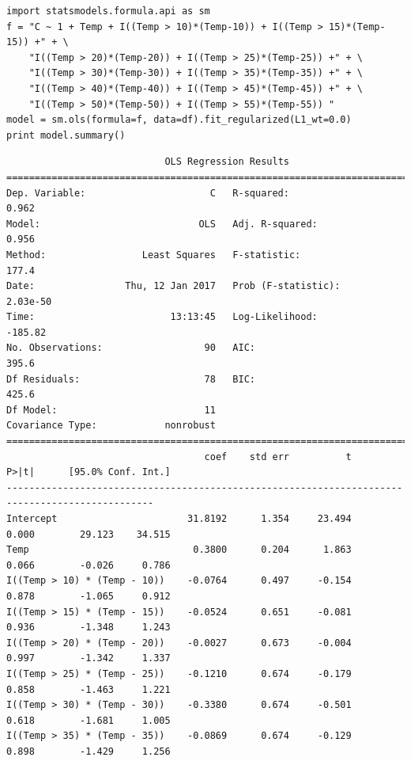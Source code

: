\documentclass[12pt,fleqn]{article}\usepackage{../../common}
\begin{document}
\begin{verbatim}
import statsmodels.formula.api as sm
f = "C ~ 1 + Temp + I((Temp > 10)*(Temp-10)) + I((Temp > 15)*(Temp-15)) +" + \
    "I((Temp > 20)*(Temp-20)) + I((Temp > 25)*(Temp-25)) +" + \
    "I((Temp > 30)*(Temp-30)) + I((Temp > 35)*(Temp-35)) +" + \
    "I((Temp > 40)*(Temp-40)) + I((Temp > 45)*(Temp-45)) +" + \
    "I((Temp > 50)*(Temp-50)) + I((Temp > 55)*(Temp-55)) " 
model = sm.ols(formula=f, data=df).fit_regularized(L1_wt=0.0)
print model.summary()
\end{verbatim}

\begin{verbatim}
                            OLS Regression Results                            
==============================================================================
Dep. Variable:                      C   R-squared:                       0.962
Model:                            OLS   Adj. R-squared:                  0.956
Method:                 Least Squares   F-statistic:                     177.4
Date:                Thu, 12 Jan 2017   Prob (F-statistic):           2.03e-50
Time:                        13:13:45   Log-Likelihood:                -185.82
No. Observations:                  90   AIC:                             395.6
Df Residuals:                      78   BIC:                             425.6
Df Model:                          11                                         
Covariance Type:            nonrobust                                         
================================================================================================
                                   coef    std err          t      P>|t|      [95.0% Conf. Int.]
------------------------------------------------------------------------------------------------
Intercept                       31.8192      1.354     23.494      0.000        29.123    34.515
Temp                             0.3800      0.204      1.863      0.066        -0.026     0.786
I((Temp > 10) * (Temp - 10))    -0.0764      0.497     -0.154      0.878        -1.065     0.912
I((Temp > 15) * (Temp - 15))    -0.0524      0.651     -0.081      0.936        -1.348     1.243
I((Temp > 20) * (Temp - 20))    -0.0027      0.673     -0.004      0.997        -1.342     1.337
I((Temp > 25) * (Temp - 25))    -0.1210      0.674     -0.179      0.858        -1.463     1.221
I((Temp > 30) * (Temp - 30))    -0.3380      0.674     -0.501      0.618        -1.681     1.005
I((Temp > 35) * (Temp - 35))    -0.0869      0.674     -0.129      0.898        -1.429     1.256

\end{verbatim}
\end{document}

